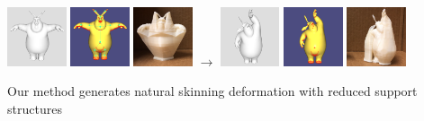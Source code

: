 \documentclass[sigconf]{acmart}
\begin{document}
\begin{teaserfigure}
    \centering
    \includegraphics[width=0.13\textwidth]{bb_bunny.png} 
    \includegraphics[width=0.13\textwidth]{bb_bunny_igl.png} 
    \includegraphics[width=0.13\textwidth]{bb_bunny_3dp.png}
    \quad
    {\LARGE$\rightarrow$}
    \quad
    \includegraphics[width=0.13\textwidth]{bb_bunny_deformed.png} 
    \includegraphics[width=0.13\textwidth]{bb_bunny_deformed_igl.png} 
    \includegraphics[width=0.13\textwidth]{bb_bunny_deformed_3dp.png}
    \caption{Our method generates natural skinning deformation with reduced support structures}
    \label{fig:bb_bunny}
\end{teaserfigure}

\maketitle



\newpage



\end{document}

